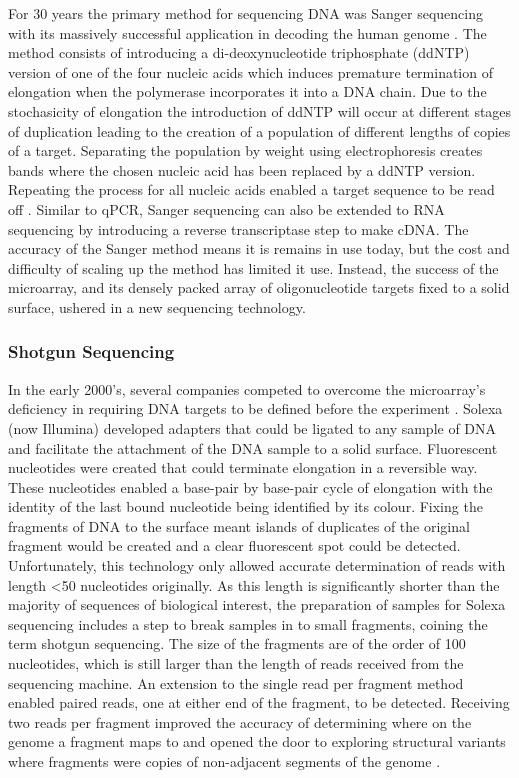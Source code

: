 \documentclass[../main.tex]{subfiles}
\begin{document}
For 30 years the primary method for sequencing DNA was Sanger sequencing with its massively successful application in decoding the human genome \cite{Lander2001}. 
The method consists of introducing a di-deoxynucleotide triphosphate (ddNTP) version of one of the four nucleic acids which induces premature termination of elongation when the polymerase incorporates it into a DNA chain.
Due to the stochasicity of elongation the introduction of ddNTP will occur at different stages of duplication leading to the creation of a population of different lengths of copies of a target.
Separating the population by weight using electrophoresis creates bands where the chosen nucleic acid has been replaced by a ddNTP version.
Repeating the process for all nucleic acids enabled a target sequence to be read off \parencite{Sanger1977}.
Similar to qPCR, Sanger sequencing can also be extended to RNA sequencing by introducing a reverse transcriptase step to make cDNA.
The accuracy of the Sanger method means it is remains in use today, but the cost and difficulty of scaling up the method has limited it use.
Instead, the success of the microarray, and its densely packed array of oligonucleotide targets fixed to a solid surface, ushered in a new sequencing technology.

\subsubsection{Shotgun Sequencing}

In the early 2000's, several companies competed to overcome the microarray's deficiency in requiring DNA targets to be defined before the experiment \parencite{Rusk2007}.
Solexa (now Illumina) developed adapters that could be ligated to any sample of DNA and facilitate the attachment of the DNA sample to a solid surface. 
Fluorescent nucleotides were created that could terminate elongation in a reversible way.
These nucleotides enabled a base-pair by base-pair cycle of elongation with the identity of the last bound nucleotide being identified by its colour.
Fixing the fragments of DNA to the surface meant islands of duplicates of the original fragment would be created and a clear fluorescent spot could be detected.
Unfortunately, this technology only allowed accurate determination of reads with length <50 nucleotides originally.
As this length is significantly shorter than the majority of sequences of biological interest, the preparation of samples for Solexa sequencing includes a step to break samples in to small fragments, coining the term shotgun sequencing.
The size of the fragments are of the order of 100 nucleotides, which is still larger than the length of reads received from the sequencing machine.
An extension to the single read per fragment method enabled paired reads, one at either end of the fragment, to be detected.
Receiving two reads per fragment improved the accuracy of determining where on the genome a fragment maps to and opened the door to exploring structural variants where fragments were copies of non-adjacent segments of the genome \parencite{Risca2015}.
\end{document}
